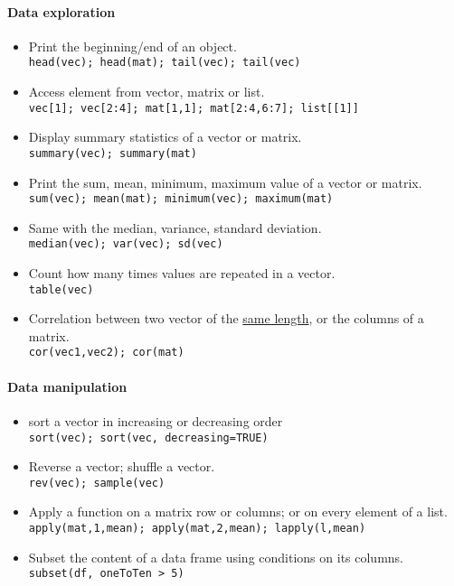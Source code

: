 \documentclass[12pt]{article}
\begin{document}
\paragraph{Data exploration} 
\begin{itemize} 
\item Print the beginning/end of an object.\\ 
  \verb!head(vec); head(mat); tail(vec); tail(vec)!
\item Access element from vector, matrix or list.\\ 
  \verb!vec[1]; vec[2:4]; mat[1,1]; mat[2:4,6:7]; list[[1]]!
\item Display summary statistics of a vector or matrix.\\ 
  \verb!summary(vec); summary(mat)!
\item Print the sum, mean, minimum, maximum value of a vector or matrix.\\ 
  \verb!sum(vec); mean(mat); minimum(vec); maximum(mat)!
\item Same with the median, variance, standard deviation.\\ 
  \verb!median(vec); var(vec); sd(vec) !
\item Count how many times values are repeated in a vector.\\ 
  \verb!table(vec)!
\item Correlation between two vector of the \uline{same length}, or the columns of a matrix.\\ 
  \verb!cor(vec1,vec2); cor(mat)!
\end{itemize}


\paragraph{Data manipulation}
\begin{itemize} 
  \item sort a vector in increasing or decreasing order \\ 
    \verb!sort(vec); sort(vec, decreasing=TRUE)!
  \item Reverse a vector; shuffle a vector. \\ 
    \verb!rev(vec); sample(vec)!
  \item Apply a function on a matrix row or columns; or on every element of a list. \\ 
    \verb!apply(mat,1,mean); apply(mat,2,mean); lapply(l,mean)!
  \item Subset the content of a data frame using conditions on its columns. \\ 
    \verb!subset(df, oneToTen > 5)!
\end{itemize}
\end{document}
